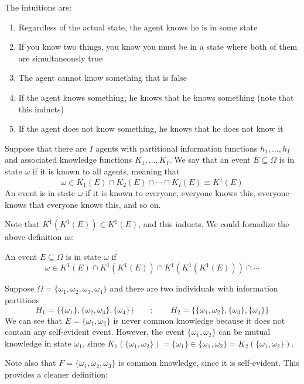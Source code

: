\documentclass[10pt]{article}
\begin{document}
The intuitions are:
\begin{enumerate}
	\item Regardless of the actual state, the agent knows he is in some state
	\item If you know two things, you know you must be in a state where both of them are simultaneously true
	\item The agent cannot know something that is false
	\item If the agent knows something, he knows that he knows something (note that this inducts)
	\item If the agent does not know something, he knows that he does not know it
\end{enumerate}

\begin{definition}
	Suppose that there are $I$ agents with partitional information functions $h_1,\dots,h_I$ and associated knowledge functions $K_1,\dots,K_I$. We say that an event $E\subseteq \Omega$ is  in state $\omega$ if it is known to all agents, meaning that\[\omega \in K_1(E) \cap K_2(E) \cap \cdots \cap K_I(E) \equiv K^1(E)\]An event is  in state $\omega$ if it is known to everyone, everyone knows this, everyone knows that everyone knows this, and so on.
\end{definition}

\begin{remark}
	Note that $K^1(K^1(E)) \in K^1(E)$, and this inducts. We could formalize the above definition as:
\end{remark}
\begin{definition}
	An event $E \subseteq \Omega$ is  in state $\omega$ if \[\omega \in K^1(E) \cap K^1(K^1(E)) \cap K^1(K^1(K^1(E))) \cap \cdots\]
\end{definition}


\begin{example}
	Suppose $\Omega = \{\omega_1,\omega_2,\omega_3,\omega_4\}$ and there are two individuals with information partitions \[H_1 = \{\{\omega_1\},\{\omega_2,\omega_3\},\{\omega_4\}\} \qquad ;\qquad H_2 = \{\{\omega_1,\omega_2\},\{\omega_3\},\{\omega_4\}\}\]We can see that $E = \{\omega_1,\omega_2\}$ is never common knowledge because it does not contain any self-evident event. However, the event $\{\omega_1,\omega_2\}$ can be mutual knowledge in state $\omega_1$, since $K_1(\{\omega_1,\omega_2\}) = \{\omega_1\} \in \{\omega_1,\omega_2\} = K_2(\{\omega_1,\omega_2\})$.
	
	Note also that $F = \{\omega_1,\omega_2,\omega_3\}$ is common knowledge, since it is self-evident. This provides a cleaner definition:
\end{example}
\end{document}
